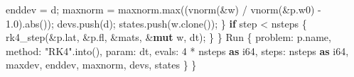 \documentclass[
  10pt,
]{article}
\newenvironment{Shaded}{}{}
\newcommand{\ControlFlowTok}[1]{\textcolor[rgb]{0.00,0.44,0.13}{\textbf{#1}}}
\newcommand{\DataTypeTok}[1]{\textcolor[rgb]{0.56,0.13,0.00}{#1}}
\newcommand{\DecValTok}[1]{\textcolor[rgb]{0.25,0.63,0.44}{#1}}
\newcommand{\KeywordTok}[1]{\textcolor[rgb]{0.00,0.44,0.13}{\textbf{#1}}}
\newcommand{\NormalTok}[1]{#1}
\newcommand{\OperatorTok}[1]{\textcolor[rgb]{0.40,0.40,0.40}{#1}}
\newcommand{\StringTok}[1]{\textcolor[rgb]{0.25,0.44,0.63}{#1}}
\begin{document}
\begin{Shaded}
\begin{Highlighting}[]
\NormalTok{            enddev }\OperatorTok{=}\NormalTok{ d}\OperatorTok{;}
\NormalTok{            maxnorm }\OperatorTok{=}\NormalTok{ maxnorm}\OperatorTok{.}\NormalTok{max((vnorm(}\OperatorTok{\&}\NormalTok{w) }\OperatorTok{/}\NormalTok{ vnorm(}\OperatorTok{\&}\NormalTok{p}\OperatorTok{.}\NormalTok{w0) }\OperatorTok{{-}} \DecValTok{1.0}\NormalTok{)}\OperatorTok{.}\NormalTok{abs())}\OperatorTok{;}
\NormalTok{            devs}\OperatorTok{.}\NormalTok{push(d)}\OperatorTok{;}
\NormalTok{            states}\OperatorTok{.}\NormalTok{push(w}\OperatorTok{.}\NormalTok{clone())}\OperatorTok{;}
        \OperatorTok{\}}
        \ControlFlowTok{if}\NormalTok{ step }\OperatorTok{\textless{}}\NormalTok{ nsteps }\OperatorTok{\{}
\NormalTok{            rk4\_step(}\OperatorTok{\&}\NormalTok{p}\OperatorTok{.}\NormalTok{lat}\OperatorTok{,} \OperatorTok{\&}\NormalTok{p}\OperatorTok{.}\NormalTok{fl}\OperatorTok{,} \OperatorTok{\&}\NormalTok{mats}\OperatorTok{,} \OperatorTok{\&}\KeywordTok{mut}\NormalTok{ w}\OperatorTok{,}\NormalTok{ dt)}\OperatorTok{;}
        \OperatorTok{\}}
    \OperatorTok{\}}
\NormalTok{    Run }\OperatorTok{\{}\NormalTok{ problem}\OperatorTok{:}\NormalTok{ p}\OperatorTok{.}\NormalTok{name}\OperatorTok{,}\NormalTok{ method}\OperatorTok{:} \StringTok{"RK4"}\OperatorTok{.}\NormalTok{into()}\OperatorTok{,}\NormalTok{ param}\OperatorTok{:}\NormalTok{ dt}\OperatorTok{,}\NormalTok{ evals}\OperatorTok{:} \DecValTok{4} \OperatorTok{*}\NormalTok{ nsteps }\KeywordTok{as} \DataTypeTok{i64}\OperatorTok{,}\NormalTok{ steps}\OperatorTok{:}\NormalTok{ nsteps }\KeywordTok{as} \DataTypeTok{i64}\OperatorTok{,}\NormalTok{ maxdev}\OperatorTok{,}\NormalTok{ enddev}\OperatorTok{,}\NormalTok{ maxnorm}\OperatorTok{,}\NormalTok{ devs}\OperatorTok{,}\NormalTok{ states }\OperatorTok{\}}
\OperatorTok{\}}


\end{Highlighting}
\end{Shaded}
\end{document}
